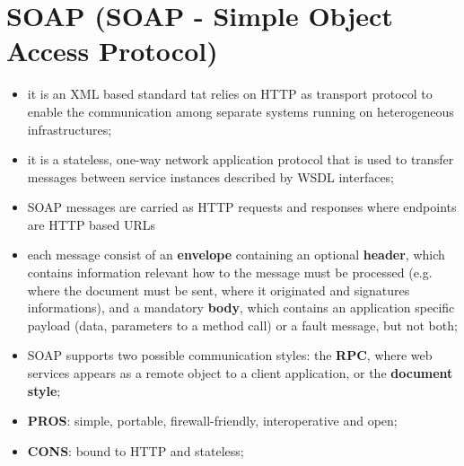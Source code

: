 \documentclass[oneside]{article}
\begin{document}




\section{SOAP (SOAP - Simple Object Access Protocol)}
\begin{itemize}
    \item it is an XML based standard tat relies on HTTP as transport protocol to enable the communication among separate systems running on heterogeneous infrastructures;
    
    \item it is a stateless, one-way network application protocol that is used to transfer messages between service instances described by WSDL interfaces;
    
    \item SOAP messages are carried as HTTP requests and responses where endpoints are HTTP based URLs
    
    \item each message consist of an \textbf{envelope} containing an optional \textbf{header}, which contains information relevant how to the message must be processed (e.g. where the document must be sent, where it originated and signatures informations), and a mandatory \textbf{body}, which contains an application specific payload (data, parameters to a method call) or a fault message, but not both;
    
    \item SOAP supports two possible communication styles: the \textbf{RPC}, where web services appears as a remote object to a client application, or the \textbf{document style};
    
    \item \textbf{PROS}: simple, portable, firewall-friendly, interoperative and open;
    
    \item \textbf{CONS}: bound to HTTP and stateless;
\end{itemize}




\end{document}
